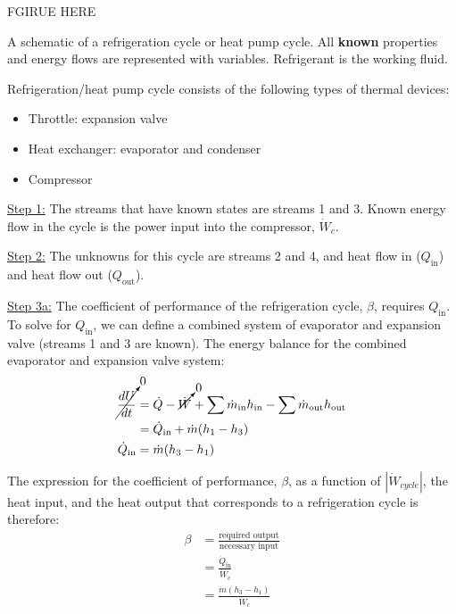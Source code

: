 \documentclass{article}
\begin{document}
\color{red} FGIRUE HERE

\small{A schematic of a refrigeration cycle or heat pump cycle. All \textbf{known} properties and energy flows are represented with variables. Refrigerant is the working fluid.}\label{fig:RefrigCycle}


Refrigeration/heat pump cycle consists of the following types of thermal devices:
\begin{itemize}
    \item Throttle: expansion valve
    \item Heat exchanger: evaporator and condenser
    \item Compressor
\end{itemize}

\underline{Step 1:} The streams that have known states are streams 1 and 3. Known energy flow in the cycle is the power input into the compressor, $\dot{W}_c$.

\hfill

\underline{Step 2:} The unknowns for this cycle are streams 2 and 4, and heat flow in ($Q_\text{in}$) and heat flow out ($Q_\text{out}$).

\hfill

\underline{Step 3a:} The coefficient of performance of the refrigeration cycle, $\beta$, requires $Q_\text{in}$. To solve for $Q_\text{in}$, we can define a combined system of evaporator and expansion valve (streams 1 and 3 are known). The energy balance for the combined evaporator and expansion valve system:
\[\begin{aligned}
\cancelto{0}{\frac{dU}{dt}} &= \dot{Q} - \cancelto{0}{\dot{W}} + \sum \dot{m}_\text{in} h_\text{in} - \sum \dot{m}_\text{out} h_\text{out} \\
&= \dot{Q}_\text{in} + \dot{m} (h_\text{1} - h_\text{3}) \\
\dot{Q}_\text{in} &= \dot{m} (h_\text{3} - h_\text{1})
\end{aligned}\]

The expression for the coefficient of performance, $\beta$, as a function of $|\dot{W}_{cycle}|$, the heat input, and the heat output that corresponds to a refrigeration cycle is therefore:
\[\begin{aligned}
\beta &= \frac{\text{required output}}{\text{necessary input}} \\
&= \frac{\dot{Q}_\text{in}}{\dot{W}_c} \\
&= \frac{\dot{m}(h_3-h_1)}{\dot{W}_c}
\end{aligned}\]
\end{document}
